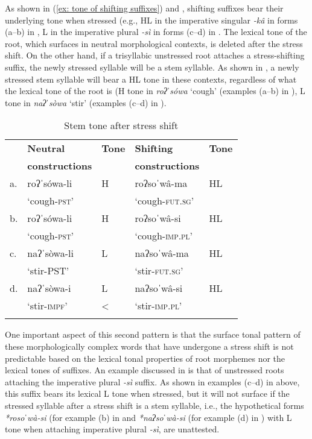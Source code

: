As shown in (\ref{ex: tone of shifting suffixes}) and , shifting suffixes bear their underlying tone when stressed (e.g., HL in the imperative singular \textit{-kâ} in forms (a--b) in , L in the imperative plural \textit{-sì} in forms (c--d) in . The lexical tone of the root, which surfaces in neutral morphological contexts, is deleted after the stress shift. On the other hand, if a trisyllabic unstressed root attaches a stress-shifting suffix, the newly stressed syllable will be a stem syllable. As shown in , a newly stressed stem syllable will bear a HL tone in these contexts, regardless of what the lexical tone of the root is (H tone in \textit{roʔˈsówa} ‘cough’ (examples (a--b) in ), L tone in \textit{naʔˈsòwa} ‘stir’ (examples (c--d) in ).

\begin{table}
\caption{Stem tone after stress shift}
\label{tab:stem-tone}

\begin{tabularx}{\textwidth}{lQlQl}
\lsptoprule
&\textbf{Neutral} & \textbf{Tone}  & \textbf{Shifting} & \textbf{Tone}\\
&\textbf{constructions} & & \textbf{constructions} & \\
\midrule
a.& roʔˈsówa-li  &	H      &	roʔsoˈwâ-ma     &	HL \\
&‘cough-\textsc{pst}’ &  &	‘cough-\textsc{fut.sg}’ &  \\
b.& roʔˈsówa-li 	& H  & roʔsoˈwâ-si &   	HL  \\
&‘cough-\textsc{pst}’ &  &	‘cough-\textsc{imp.pl}’ &  \\
c.& naʔˈsòwa-li   & L    &	naʔsoˈwâ-ma &  	HL \\
&‘stir-PST’ & 		& ‘stir-\textsc{fut.sg}’ &  \\
d.&naʔˈsòwa-i	& L  &  naʔsoˈwâ-si &   HL\\
&‘stir-\textsc{impf}’ & < & ‘stir-\textsc{imp.pl}’ &  \\
\lspbottomrule
\end{tabularx}
\end{table}


One important aspect of this second pattern is that the surface tonal pattern of these morphologically complex words that have undergone a stress shift is not predictable based on the lexical tonal properties of root morphemes nor the lexical tones of suffixes. An example discussed in \citet{caballero2021grammatical} is that of unstressed roots attaching the imperative plural \textit{-sì} suffix. As shown in examples (c--d) in  above, this suffix bears its lexical L tone when stressed, but it will not surface if the stressed syllable after a stress shift is a stem syllable, i.e., the hypothetical forms \textit{*rosoˈwà-si} (for example (b) in  and \textit{*naʔsoˈwà-si} (for example (d) in ) with L tone when attaching imperative plural \textit{-sì}, are unattested.

